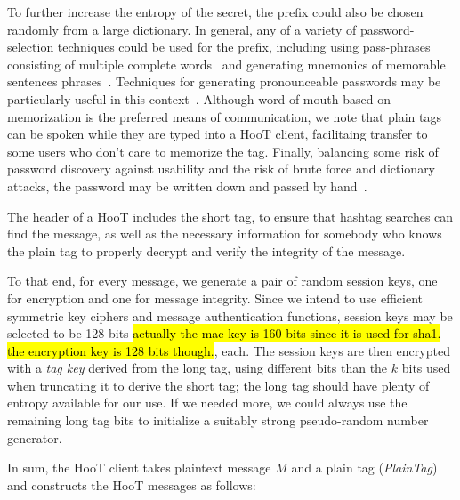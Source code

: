 To further increase the entropy of the secret, the prefix could also be
chosen randomly from a large dictionary. In general, any of a variety of
password-selection techniques could be used for the prefix, including
using pass-phrases consisting of multiple complete
words~\cite{passphrase} and generating mnemonics of memorable sentences
phrases~\cite{mnemonics}. Techniques for generating pronounceable
passwords may be particularly useful in this
context~\cite{gasser}. Although word-of-mouth based on memorization is
the preferred means of communication, we note that plain tags can be
spoken while they are typed into a HooT client, facilitaing transfer to
some users who don't care to memorize the tag. Finally, balancing some
risk of password discovery against usability and the risk of brute force
and dictionary attacks, the password may be written down and passed by
hand~\cite{written-passwords}.

%
The header of a HooT includes the short tag, to ensure that hashtag
searches can find the message, as well as the necessary information for
somebody who knows the plain tag to properly decrypt and verify the
integrity of the message.

To that end, for every message, we generate a pair of random session
keys, one for encryption and one for message integrity. Since we intend
to use efficient symmetric key ciphers and message authentication
functions, session keys may be selected to be 128 bits \hl{actually the
  mac key is 160 bits since it is used for sha1. the encryption key is
  128 bits though.},  each. The session keys
are then encrypted with a {\em tag key} derived from the long tag, using
different bits than the $k$ bits used when truncating it to derive the
short tag; the long tag should have plenty of entropy available for our
use. 
If we needed more, we could always use the remaining long tag bits
to initialize a suitably strong pseudo-random number generator.

In sum, the HooT client takes plaintext message $M$ and a plain tag
({\em PlainTag}) and constructs the HooT messages as follows:
%

